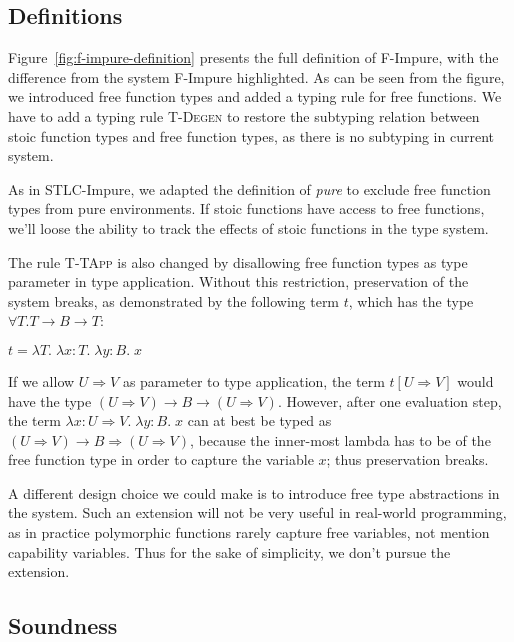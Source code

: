 \subsection{Definitions}

Figure~\ref{fig:f-impure-definition} presents the full definition of
F-Impure, with the difference from the system F-Impure highlighted. As
can be seen from the figure, we introduced free function types and
added a typing rule for free functions. We have to add a typing rule
\textsc{T-Degen} to restore the subtyping relation between stoic
function types and free function types, as there is no subtyping in
current system.

As in STLC-Impure, we adapted the definition of \emph{pure} to exclude
free function types from pure environments. If stoic functions have
access to free functions, we'll loose the ability to track the effects
of stoic functions in the type system.

The rule \textsc{T-TApp} is also changed by disallowing free function
types as type parameter in type application. Without this restriction,
preservation of the system breaks, as demonstrated by the following
term $t$, which has the type $\forall T. T \to B \to T$:

\begin{center}
  $t = \lambda T. \; \lambda x:T. \; \lambda y:B. \; x$
\end{center}

If we allow $U \Rightarrow V$ as parameter to type application, the
term $t [U \Rightarrow V]$ would have the type
$(U \Rightarrow V) \to B \to (U \Rightarrow V)$.  However, after one
evaluation step, the term
$\lambda x:U \Rightarrow V. \; \lambda y:B. \; x$ can at best be typed
as $(U \Rightarrow V) \to B \Rightarrow (U \Rightarrow V)$, because
the inner-most lambda has to be of the free function type in order to
capture the variable $x$; thus preservation breaks.

A different design choice we could make is to introduce free type
abstractions in the system. Such an extension will not be very useful
in real-world programming, as in practice polymorphic functions rarely
capture free variables, not mention capability variables. Thus for the
sake of simplicity, we don't pursue the extension.

\subsection{Soundness}

